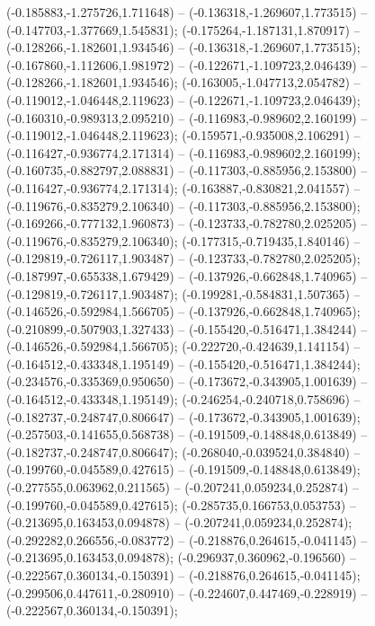  (-0.185883,-1.275726,1.711648) -- (-0.136318,-1.269607,1.773515) -- (-0.147703,-1.377669,1.545831);
 (-0.175264,-1.187131,1.870917) -- (-0.128266,-1.182601,1.934546) -- (-0.136318,-1.269607,1.773515);
 (-0.167860,-1.112606,1.981972) -- (-0.122671,-1.109723,2.046439) -- (-0.128266,-1.182601,1.934546);
 (-0.163005,-1.047713,2.054782) -- (-0.119012,-1.046448,2.119623) -- (-0.122671,-1.109723,2.046439);
 (-0.160310,-0.989313,2.095210) -- (-0.116983,-0.989602,2.160199) -- (-0.119012,-1.046448,2.119623);
 (-0.159571,-0.935008,2.106291) -- (-0.116427,-0.936774,2.171314) -- (-0.116983,-0.989602,2.160199);
 (-0.160735,-0.882797,2.088831) -- (-0.117303,-0.885956,2.153800) -- (-0.116427,-0.936774,2.171314);
 (-0.163887,-0.830821,2.041557) -- (-0.119676,-0.835279,2.106340) -- (-0.117303,-0.885956,2.153800);
 (-0.169266,-0.777132,1.960873) -- (-0.123733,-0.782780,2.025205) -- (-0.119676,-0.835279,2.106340);
 (-0.177315,-0.719435,1.840146) -- (-0.129819,-0.726117,1.903487) -- (-0.123733,-0.782780,2.025205);
 (-0.187997,-0.655338,1.679429) -- (-0.137926,-0.662848,1.740965) -- (-0.129819,-0.726117,1.903487);
 (-0.199281,-0.584831,1.507365) -- (-0.146526,-0.592984,1.566705) -- (-0.137926,-0.662848,1.740965);
 (-0.210899,-0.507903,1.327433) -- (-0.155420,-0.516471,1.384244) -- (-0.146526,-0.592984,1.566705);
 (-0.222720,-0.424639,1.141154) -- (-0.164512,-0.433348,1.195149) -- (-0.155420,-0.516471,1.384244);
 (-0.234576,-0.335369,0.950650) -- (-0.173672,-0.343905,1.001639) -- (-0.164512,-0.433348,1.195149);
 (-0.246254,-0.240718,0.758696) -- (-0.182737,-0.248747,0.806647) -- (-0.173672,-0.343905,1.001639);
 (-0.257503,-0.141655,0.568738) -- (-0.191509,-0.148848,0.613849) -- (-0.182737,-0.248747,0.806647);
 (-0.268040,-0.039524,0.384840) -- (-0.199760,-0.045589,0.427615) -- (-0.191509,-0.148848,0.613849);
 (-0.277555,0.063962,0.211565) -- (-0.207241,0.059234,0.252874) -- (-0.199760,-0.045589,0.427615);
 (-0.285735,0.166753,0.053753) -- (-0.213695,0.163453,0.094878) -- (-0.207241,0.059234,0.252874);
 (-0.292282,0.266556,-0.083772) -- (-0.218876,0.264615,-0.041145) -- (-0.213695,0.163453,0.094878);
 (-0.296937,0.360962,-0.196560) -- (-0.222567,0.360134,-0.150391) -- (-0.218876,0.264615,-0.041145);
 (-0.299506,0.447611,-0.280910) -- (-0.224607,0.447469,-0.228919) -- (-0.222567,0.360134,-0.150391);
